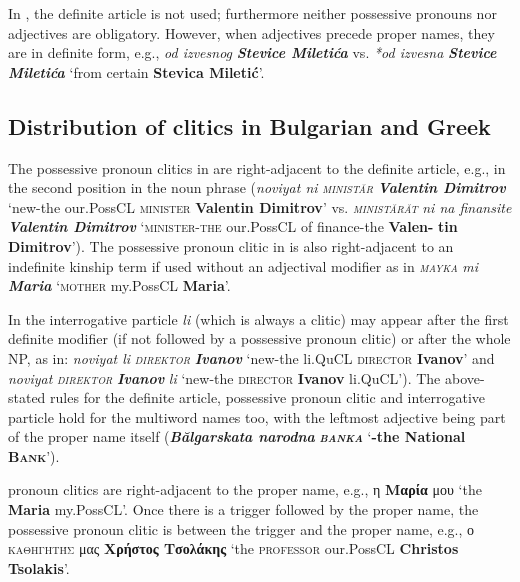 \documentclass[output=paper]{langsci/langscibook}
\newcommand{\trigger}[1]{\textsc{#1}}
\begin{document}
In , the definite article is not used; furthermore neither
possessive pronouns nor adjectives are obligatory. However, when
adjectives precede proper names, they are in definite form, e.g.,
\textit{od izvesnog }\textbf{\textit{Stevice Miletića}} vs. \textit{*od
izvesna }\textbf{\textit{Stevice Miletića}} ‘from certain
\textbf{Stevica Miletić}’.


\subsection{Distribution of clitics in {Bulgarian} and {Greek}} %


The possessive pronoun   clitics in  are right-adjacent to the
definite article, e.g., in the second position in the noun phrase
(\textit{noviyat ni }\textit{\trigger{ministăr}} \textbf{\textit{Valentin
Dimitrov}} ‘new-the our.PossCL \trigger{minister} \textbf{Valentin
Dimitrov}’ vs. \textit{\trigger{ministărăt}} \textit{ni na finansite
}\textbf{\textit{Valentin Dimitrov}} ‘\trigger{minister-the} our.PossCL
of finance-the \textbf{Valen-} \textbf{tin Dimitrov}’). The possessive pronoun
clitic in  is also right-adjacent to an indefinite kinship
term if used without an adjectival modifier as in
\textit{\trigger{mayka}} \textit{mi} \textbf{\textit{Maria}}
‘\trigger{mother} my.PossCL \textbf{Maria}’.



In  the interrogative particle \textit{li} (which is always a
clitic) may appear after the first definite modifier (if not followed
by a possessive pronoun clitic) or after the whole NP, as in:
\textit{noviyat li }\textit{\trigger{direktor}} \textbf{\textit{Ivanov}}
‘new-the li.QuCL \trigger{d}\trigger{irector}\textbf{ Ivanov}’ and
\textit{noviyat }\textit{\trigger{direktor}}\textit{
}\textbf{\textit{Ivanov}}\textit{ li} `new-the
\trigger{d}\trigger{ir}\trigger{ector} \textbf{Ivanov} li.QuCL'). The
above-stated rules for the definite article, possessive pronoun clitic
and interrogative particle hold for the multiword names too, with the
leftmost adjective being part of the proper name itself
(\textbf{\textit{Bălgarskata narodna }}\textbf{\textit{\trigger{banka}}}
‘\textbf{-the National }\textbf{\trigger{Bank}}’).



 pronoun clitics are right-adjacent to the proper name, e.g.,
η \textbf{Μαρία} μου ‘the \textbf{Maria
}my.PossCL’. Once there is a trigger followed by the proper name, the
possessive pronoun clitic is between the trigger and the proper name,
e.g., ο \trigger{καθηγητής} μας
\textbf{Χρήστος Τσολάκης} ‘the \trigger{professor} our.PossCL
\textbf{Christos Tsolakis}’.
\end{document}
